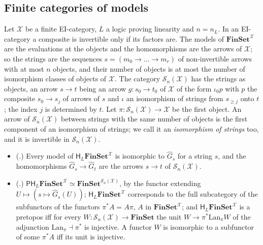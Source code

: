 \documentclass[11pt]{amsart}
\theoremstyle{definition}
\newcommand{\Fin}{\mathbf{FinSet}}
\newcommand{\Lan}{\mathrm{Lan}}
\newcommand{\PP}{\mathsf P}
\newcommand{\HH}{\mathsf H}
\newcommand{\cX}{\mathcal X}
\newcommand{\cS}{\mathcal S}
\begin{document}
\subsection*{Finite categories of models}
Let $\cX$ be a finite EI-category, $L$ a logic proving linearity and
$n=n_L$. In an EI-category a composite is invertible only if its
factors are. The models of $\Fin^\cX$ are the evaluations at the
objects and the homomorphisms are the arrows of $\cX$; so the strings
are the sequences $s=(m_0\to\dots\to m_r)$ of non-invertible arrows
with at most $n$ objects, and their number of objects is at most the
number of isomorphism classes of objects of $\cX$. The category
$\cS_n(\cX)$ has the strings as objects, an arrow $s\to t$ being an
arrow $g\colon s_0\to t_0$ of $\cX$ of the form $\iota_0p$ with $p$
the composite $s_0\to s_j$ of arrows of $s$ and $\iota$ an isomorphism
of strings from $s_{\ge j}$ onto $t$; the index $j$ is determined by
$t$. Let $\pi\colon\cS_n(\cX)\to\cX$ be the first object. An arrow of
$\cS_n(\cX)$ between strings with the same number of objects is the
first component of an isomorphism of strings; we call it an
\emph{isomorphism of strings} too, and it is invertible in
$\cS_n(\cX)$.

\begin{itemize}
\item[(R8)] (\cite[Prop.~4.2]{Strings}.) Every model of
$\HH_L\Fin^\cX$ is isomorphic to $\hat G_s$ for a string $s$, and the
homomorphisms $\hat G_s\to\hat G_t$ are the arrows $s\to t$ of
$\cS_n(\cX)$.
\item[(R9)] (\cite[Thm.~1.1]{Strings}.) $\PP\HH_L\Fin^\cX\simeq
\Fin^{\cS_n(\cX)}$, by the functor extending $U\mapsto(s\mapsto\hat
G_s(U))$; $\HH_L\Fin^\cX$ corresponds to the full subcategory of the
subfunctors of the functors $\pi^*A=A\pi$, $A$ in $\Fin^\cX$; and
$\HH_L\Fin^\cX$ is a pretopos iff for every $W\colon\cS_n(\cX)\to\Fin$
the unit $W\to\pi^*\Lan_\pi W$ of the adjunction $\Lan_\pi\dashv\pi^*$
is injective. A functor $W$ is isomorphic to a subfunctor of some
$\pi^*A$ iff its unit is injective.
\end{itemize}
\end{document}
